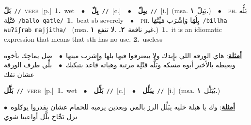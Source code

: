 \documentclass[10pt,a4paper,twoside]{article} %
\begin{document}
\begin{multicols}{2}
{\setlength\topsep{0pt}\textbf{\foreignlanguage{arabic}{بَلّ}}\ {\color{gray}\texttt{//}\color{black}}\ \textsc{verb}\ [p.]\ \textbf{1.}~wet\ \ $\bullet$\ \ \setlength\topsep{0pt}\textbf{\foreignlanguage{arabic}{بِلّ}}\ {\color{gray}\texttt{//}\color{black}}\ [c.]\ \ $\bullet$\ \ \setlength\topsep{0pt}\textbf{\foreignlanguage{arabic}{يبِلّ}}\ {\color{gray}\texttt{//}\color{black}}\ [i.]\ \color{gray}(msa. \foreignlanguage{arabic}{يَبِلّ}~\foreignlanguage{arabic}{\textbf{١.}})\color{black}\ \ $\bullet$\ \ \textsc{ph.} \color{gray} \foreignlanguage{arabic}{بَلُّه قتْلِة}\color{black}\ {\color{gray}\texttt{/{\sffamily ballo qatle}/}\color{black}}\ \textbf{1.}~beat sb severely\ \ $\bullet$\ \ \textsc{ph.} \color{gray} \foreignlanguage{arabic}{بِلْهَا وَاِشْرَب مَيِّتْهَا}\color{black}\ {\color{gray}\texttt{/{\sffamily billha wuʔiʃrab majjitha}/}\color{black}}\ \color{gray} (msa. \foreignlanguage{arabic}{غير نافعة}~\foreignlanguage{arabic}{\textbf{٢.}}  .\foreignlanguage{arabic}{لا تنفع}~\foreignlanguage{arabic}{\textbf{١.}})\color{black}\ \textbf{1.}~it is an idiomatic expression that means that sth has no use.  \textbf{2.}~useless\  \begin{flushright}\color{gray}\foreignlanguage{arabic}{\textbf{\underline{\foreignlanguage{arabic}{أمثلة}}}: هاي الورقة اللي بإِيدك ولا بيعترفوا فيها بلها وإِشرب ميتها\ $\bullet$\ \  ضل يماحِك بأخوه ويعيطه بالأخير أبوه مسكه وبَلُّه قتْلِة مرتبة وهياته قاعد بتبكبك\ $\bullet$\ \  بلِّي طرف الورقة عشان تفك}\end{flushright}\color{black}} \vspace{2mm}

{\setlength\topsep{0pt}\textbf{\foreignlanguage{arabic}{بَلَّل}}\ {\color{gray}\texttt{//}\color{black}}\ \textsc{verb}\ [p.]\ \textbf{1.}~wet\ \ $\bullet$\ \ \setlength\topsep{0pt}\textbf{\foreignlanguage{arabic}{بَلِّل}}\ {\color{gray}\texttt{//}\color{black}}\ [c.]\ \ $\bullet$\ \ \setlength\topsep{0pt}\textbf{\foreignlanguage{arabic}{يبَلِّل}}\ {\color{gray}\texttt{//}\color{black}}\ [i.]\ \color{gray}(msa. \foreignlanguage{arabic}{يُبَلِّل}~\foreignlanguage{arabic}{\textbf{١.}})\color{black}\  \begin{flushright}\color{gray}\foreignlanguage{arabic}{\textbf{\underline{\foreignlanguage{arabic}{أمثلة}}}: وك يا هبلة خليه يبَلِّل الرز بالمي وبعدين يرميه للحمام عشان يقدروا يوكلوه\ $\bullet$\ \  نزل نَخّاخ بلَّل أواعينا شوي}\end{flushright}\color{black}} \vspace{2mm}


\end{multicols}
\end{document}
